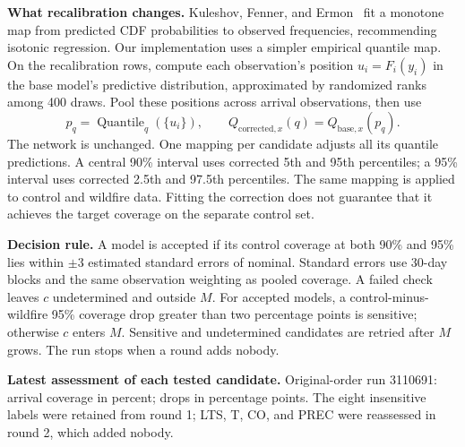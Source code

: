 \documentclass[11pt]{article}
\begin{document}
\textbf{What recalibration changes.}
Kuleshov, Fenner, and Ermon~\cite{kuleshov2018} fit a monotone map from predicted
CDF probabilities to observed frequencies, recommending isotonic regression.
Our implementation uses a simpler empirical quantile map. On the recalibration
rows, compute each observation's position $u_i=F_i(y_i)$ in the base model's
predictive distribution, approximated by randomized ranks among 400 draws.
Pool these positions across arrival observations, then use
\[
 p_q=\operatorname{Quantile}_q(\{u_i\}),
 \qquad Q_{\mathrm{corrected},x}(q)=Q_{\mathrm{base},x}(p_q).
\]
The network is unchanged. One mapping per candidate adjusts all its quantile
predictions. A central 90\% interval uses corrected 5th and 95th percentiles;
a 95\% interval uses corrected 2.5th and 97.5th percentiles. The same mapping is
applied to control and wildfire data. Fitting the correction does not guarantee
that it achieves the target coverage on the separate control set.

\textbf{Decision rule.}
A model is accepted if its control coverage at both 90\% and 95\% lies within
$\pm3$ estimated standard errors of nominal. Standard errors use 30-day blocks
and the same observation weighting as pooled coverage. A failed check leaves
$c$ undetermined and outside $M$. For accepted models, a control-minus-wildfire
95\% coverage drop greater than two percentage points is sensitive; otherwise
$c$ enters $M$. Sensitive and undetermined candidates are retried after $M$ grows.
The run stops when a round adds nobody.

\newpage
\small
\textbf{Latest assessment of each tested candidate.}
Original-order run 3110691: arrival coverage in percent; drops in percentage points.
The eight insensitive labels were retained from round 1; LTS, T, CO, and PREC
were reassessed in round 2, which added nobody.
\end{document}
